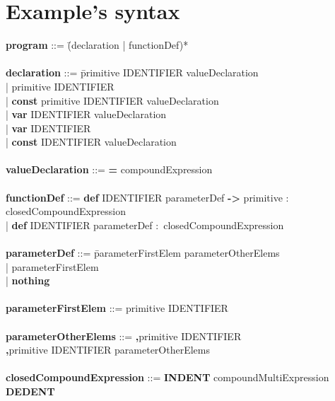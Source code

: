 \section{Example's syntax}
\begin{tabbing}

{\bf program}                     ::= \=(declaration | functionDef)*\\
\\
{\bf declaration}                 ::= \=primitive IDENTIFIER valueDeclaration\\
                                      \>| primitive IDENTIFIER\\
                                      \>| \textbf{const} primitive IDENTIFIER valueDeclaration\\
                                      \>| \textbf{var} IDENTIFIER valueDeclaration\\
                                      \>| \textbf{var} IDENTIFIER\\
                                      \>| \textbf{const} IDENTIFIER valueDeclaration\\
\\
{\bf valueDeclaration}            ::= \textbf{=} compoundExpression\\
\\
{\bf functionDef}                 ::= \= \textbf{def} IDENTIFIER parameterDef \textbf{->} primitive \textbf{$\colon$} closedCompoundExpression\\
                                      \>| \textbf{def} IDENTIFIER parameterDef \textbf{$\colon$} closedCompoundExpression\\
\\
{\bf parameterDef}                ::= \=parameterFirstElem parameterOtherElems\\
                                      \>| parameterFirstElem\\
                                      \>| \textbf{nothing}\\
\\
{\bf parameterFirstElem}          ::= primitive IDENTIFIER\\
\\
{\bf parameterOtherElems}         ::= \=\textbf{,}primitive IDENTIFIER\\
                                      \>\textbf{,}primitive IDENTIFIER parameterOtherElems\\  
\\
{\bf closedCompoundExpression}    ::= \textbf{INDENT} compoundMultiExpression \textbf{DEDENT}\\

\end{tabbing}
